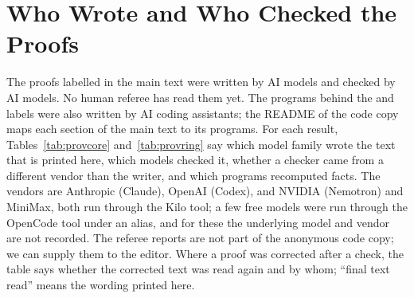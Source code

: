 \section{Who Wrote and Who Checked the Proofs}\label{S-prov}
The proofs labelled  in the main text were written by AI models and checked by AI models. No human referee has
read them yet. The programs behind the  and  labels were also written by AI coding assistants; the README of the code copy maps each section of the main text to its programs. For each result, Tables~\ref{tab:provcore} and~\ref{tab:provring} say which model family wrote the text
that is printed here, which models checked it, whether a checker came from a different vendor than the writer, and
which programs recomputed facts. The vendors are Anthropic (Claude), OpenAI (Codex), and NVIDIA (Nemotron) and MiniMax, both run through
the Kilo tool; a few free models were run through the OpenCode tool under an alias, and for these the underlying model and
vendor are not recorded. The referee reports are not part of the anonymous code copy; we can supply them to the editor. Where a proof was corrected after a check, the
table says whether the corrected text was read again and by whom; ``final text read'' means the wording printed here.

